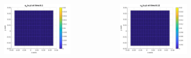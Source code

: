 \documentclass[8pt]{beamer}
\begin{document}
\begin{frame}
\begin{columns}
\begin{column}{0.25\textwidth}
    		\begin{figure}[h]
    			\includegraphics[width=\textwidth]{tc1-1/010.jpg}
    		\end{figure}
    	\end{column}
    	\begin{column}{0.25\textwidth}
    		\begin{figure}[h]
    			\includegraphics[width=\textwidth]{tc1-1/012.jpg}
    		\end{figure}
    	\end{column}
    	\begin{column}{0.25\textwidth}
    		\begin{figure}[h]

\end{figure}
\end{column}
\end{columns}
\end{frame}
\end{document}
